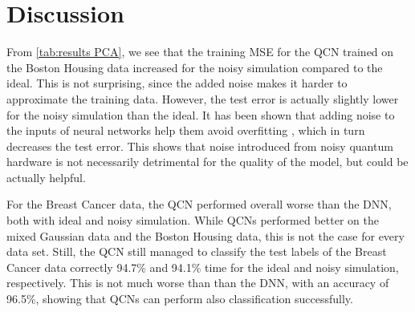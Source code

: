 \section{Discussion}\label{sec:Real Data Discussion}

From \cref{tab:results PCA}, we see that the training MSE for the QCN trained on the Boston Housing data increased for the noisy simulation compared to the ideal. This is not surprising, since the added noise makes it harder to approximate the training data. However, the test error is actually slightly lower for the noisy simulation than the ideal. It has been shown that adding noise to the inputs of neural networks help them avoid overfitting \cite{noh2017regularizing}, which in turn decreases the test error. This shows that noise introduced from noisy quantum hardware is not necessarily detrimental for the quality of the model, but could be actually helpful. 

For the Breast Cancer data, the QCN performed overall worse than the DNN, both with ideal and noisy simulation. While QCNs performed better on the mixed Gaussian data and the Boston Housing data, this is not the case for every data set. Still, the QCN still managed to classify the test labels of the Breast Cancer data correctly 94.7\% and 94.1\% time for the ideal and noisy simulation, respectively. This is not much worse than than the DNN, with an accuracy of 96.5\%, showing that QCNs can perform also classification successfully. 
